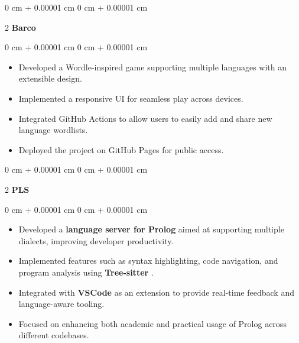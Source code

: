 \documentclass[10pt, letterpaper]{article}
\newenvironment{highlights}{
        \begin{itemize}[
            topsep=0.10 cm,
            parsep=0.10 cm,
            partopsep=0pt,
            itemsep=0pt,
            leftmargin=0 cm + 10pt
        ]
    }{
        \end{itemize}
    } %
\newenvironment{onecolentry}{
        \begin{adjustwidth}{
            0 cm + 0.00001 cm
        }{
            0 cm + 0.00001 cm
        }
    }{
        \end{adjustwidth}
    } %
\newenvironment{twocolentry}[2][]{
        \onecolentry
        \def\secondColumn{#2}
        \setcolumnwidth{\fill, 6.5cm}
        \begin{paracol}{2}
    }{
        \switchcolumn \raggedleft \secondColumn
        \end{paracol}
        \endonecolentry
    } %
\begin{document}
\vspace{0.2 cm}
\begin{twocolentry}{ }\textbf{Barco}\end{twocolentry}\vspace{0.10 cm}\begin{onecolentry}\begin{highlights}
\item Developed a Wordle-inspired game supporting multiple languages with an extensible design.

\item Implemented a responsive UI for seamless play across devices.

\item Integrated GitHub Actions to allow users to easily add and share new language wordlists.

\item Deployed the project on GitHub Pages for public access.

\end{highlights} \end{onecolentry}
\vspace{0.2 cm}
\begin{twocolentry}{ }\textbf{PLS}\end{twocolentry}\vspace{0.10 cm}\begin{onecolentry}\begin{highlights}
\item Developed a  \textbf{language server for Prolog}  aimed at supporting multiple dialects, improving developer productivity.

\item Implemented features such as syntax highlighting, code navigation, and program analysis using  \textbf{Tree-sitter} .

\item Integrated with  \textbf{VSCode}  as an extension to provide real-time feedback and language-aware tooling.

\item Focused on enhancing both academic and practical usage of Prolog across different codebases.

\end{highlights} \end{onecolentry}
\vspace{0.2 cm}
\end{document}
